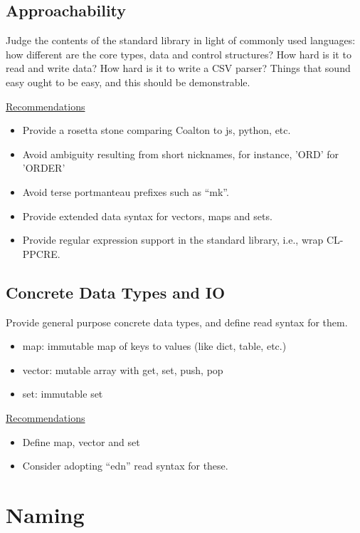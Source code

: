 \documentclass[12pt]{article}
\begin{document}
\subsection{Approachability}

Judge the contents of the standard library in light of commonly used
languages: how different are the core types, data and control
structures? How hard is it to read and write data? How hard is it to
write a CSV parser? Things that sound easy ought to be easy, and this
should be demonstrable.

\bigskip
\underline{Recommendations}

\begin{itemize}
\item Provide a rosetta stone comparing Coalton to js, python, etc.
\item Avoid ambiguity resulting from short nicknames, for instance,
  'ORD' for 'ORDER'
\item Avoid terse portmanteau prefixes such as ``mk''.
\item Provide extended data syntax for vectors, maps and sets.
\item Provide regular expression support in the standard library,
  i.e., wrap CL-PPCRE.

\end{itemize}

\subsection{Concrete Data Types and IO}

Provide general purpose concrete data types, and define read syntax for them.

\begin{itemize}
\item map: immutable map of keys to values (like dict, table, etc.)
\item vector: mutable array with get, set, push, pop
\item set: immutable set
\end{itemize}

\bigskip
\underline{Recommendations}
\begin{itemize}
\item Define map, vector and set
\item Consider adopting ``edn'' read syntax for these.
\end{itemize}

\section{Naming}
\end{document}
